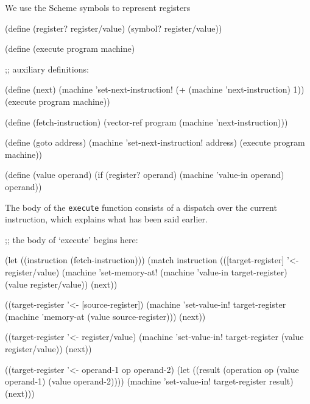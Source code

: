 We use the Scheme symbols to represent registers

\begin{Snippet}
(define (register? register/value)
  (symbol? register/value))
\end{Snippet}

\begin{Snippet}
(define (execute program machine)
\end{Snippet}
\begin{Snippet}
  ;; auxiliary definitions:

  (define (next)
    (machine 'set-next-instruction!
             (+ (machine 'next-instruction) 1))
    (execute program machine))
\end{Snippet}
\begin{Snippet}
  (define (fetch-instruction)
    (vector-ref program (machine 'next-instruction))) 
\end{Snippet}
\begin{Snippet}
  (define (goto address)
    (machine 'set-next-instruction! address)
    (execute program machine))
\end{Snippet}
\begin{Snippet}
  (define (value operand)
    (if (register? operand)
	(machine 'value-in operand)
        operand))
\end{Snippet}
The body of the \texttt{execute} function consists of
a dispatch over the current instruction, which explains
what has been said earlier.
\begin{Snippet}
  ;; the body of `execute' begins here:

  (let ((instruction (fetch-instruction)))
    (match instruction
      (([target-register] '<- register/value)
       (machine 'set-memory-at!
                (machine 'value-in target-register)
		(value register/value))
       (next))
\end{Snippet}
\begin{Snippet}
      ((target-register '<- [source-register])
       (machine 'set-value-in! target-register
		(machine 'memory-at (value source-register)))
       (next))
\end{Snippet}
\begin{Snippet}
      ((target-register '<- register/value)
       (machine 'set-value-in! target-register
                               (value register/value))
       (next))
\end{Snippet}
\begin{Snippet}
      ((target-register '<- operand-1 op operand-2)
       (let ((result (operation op (value operand-1)
				   (value operand-2))))
	 (machine 'set-value-in! target-register result)
	 (next)))
\end{Snippet}
